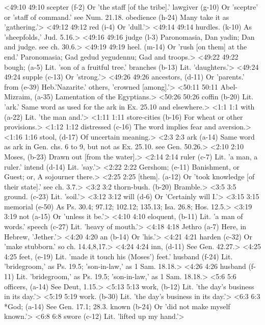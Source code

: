 <49:10 49:10  scepter (f-2)  Or 'the staff [of the tribe].'
  lawgiver (g-10)  Or 'sceptre' or 'staff of command.' see Num. 21.18.
  obedience (h-24)  Many take it as 'gathering.'>
<49:12 49:12  red (i-4)  Or 'dull.'>
<49:14 49:14  hurdles. (k-10)  As 'sheepfolds,' Jud. 5.16.>
<49:16 49:16  judge (l-3)  Paronomasia, Dan yadin; Dan and judge. see ch. 30.6.>
<49:19 49:19  heel. (m-14)  Or 'rush [on them] at the end.' Paronomasia; Gad gedud yegudennu;  Gad and troops.>
<49:22 49:22  bough; (a-5)  Lit. 'son of a fruitful tree.'
  branches (b-13)  Lit. 'daughters.'>
<49:24 49:24  supple (c-13)  Or 'strong.'>
<49:26 49:26  ancestors, (d-11)  Or 'parents.'
  from (e-39)  Heb.'Nazarite.' others, 'crowned [among].'>
<50:11 50:11  Abel-Mizraim, (a-35)  Lamentation of the Egyptians.>
<50:26 50:26  coffin (b-20)  Lit. 'ark.' Same word as used for the ark in Ex. 25.10 and  elsewhere.>
<1:1 1:1  with (a-22)  Lit. 'the man and.'>
<1:11 1:11  store-cities (b-16)  For wheat or other provisions.>
<1:12 1:12  distressed (c-16)  The word implies fear and aversion.>
<1:16 1:16  stool, (d-17)  Of uncertain meaning.>
<2:3 2:3  ark (a-14)  Same word as ark in Gen. chs. 6 to 9, but not as Ex. 25.10.  see Gen. 50.26.>
<2:10 2:10  Moses, (b-23)  Drawn out [from the water].>
<2:14 2:14  ruler (c-7)  Lit. 'a man, a ruler.'
  intend (d-14)  Lit. 'say.'>
<2:22 2:22  Gershom; (e-11)  Banishment, or Guest; or, A sojourner there.>
<2:25 2:25  [them]. (a-12)  Or 'took knowledge [of their state].' see ch. 3.7.>
<3:2 3:2  thorn-bush. (b-20)  Bramble.>
<3:5 3:5  ground. (c-23)  Lit. 'soil.'>
<3:12 3:12  will (d-6)  Or 'Certainly will I.'>
<3:15 3:15  memorial (e-50)  As Ps. 30.4; 97.12; 102.12; 135.13; Isa. 26.8; Hos. 12.5.>
<3:19 3:19  not (a-15)  Or 'unless it be.'>
<4:10 4:10  eloquent, (b-11)  Lit. 'a man of words.'
  speech (c-27)  Lit. 'heavy of mouth.'>
<4:18 4:18  Jethro (a-7)  Here, in Hebrew, 'Jether.'>
<4:20 4:20  an (b-14)  Or 'his.'>
<4:21 4:21  harden (c-32)  Or 'make stubborn.' so ch. 14.4,8,17.>
<4:24 4:24  inn, (d-11)  See Gen. 42.27.>
<4:25 4:25  feet, (e-19)  Lit. 'made it touch his (Moses') feet.'
  husband (f-24)  Lit. 'bridegroom,' as Ps. 19.5; 'son-in-law,' as 1 Sam. 18.18.>
<4:26 4:26  husband (f-11)  Lit. 'bridegroom,' as Ps. 19.5; 'son-in-law,' as 1 Sam.  18.18.>
<5:6 5:6  officers, (a-14)  See Deut, 1.15.>
<5:13 5:13  work, (b-12) Lit. 'the day's business in its day.'>
<5:19 5:19  work. (b-30)  Lit. 'the day's business in its day.'>
<6:3 6:3  *God; (a-14)  See Gen. 17.1; 28.3.
  known (b-24)  Or 'did not make myself known.'>
<6:8 6:8  swore (c-12)  Lit. 'lifted up my hand.'>
